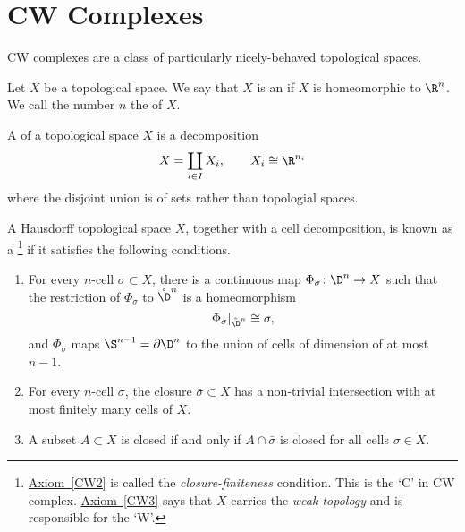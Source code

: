 \documentclass[main.tex]{subfiles}
\begin{document}
\section{CW Complexes}
\label{sec:cw_complexes}

CW complexes are a class of particularly nicely-behaved topological spaces.

\begin{definition}[cell]
  \label{def:cell}
  Let $X$ be a topological space. We say that $X$ is an  if $X$ is homeomorphic to $\R^{n}$. We call the number $n$ the  of $X$.
\end{definition}

\begin{definition}
  \label{def:cell_decomposition}
  A  of a topological space $X$ is a decomposition
  \begin{equation*}
    X = \coprod_{i \in I} X_{i},\qquad X_{i} \cong \R^{n_{i}}
  \end{equation*}
  where the disjoint union is of sets rather than topologial spaces.
\end{definition}

\begin{definition}[CW complex]
  \label{def:cw_complex}
  A Hausdorff topological space $X$, together with a cell decomposition, is known as a \footnote{\hyperref[CW2]{Axiom~\ref*{CW2}} is called the \emph{closure-finiteness} condition. This is the `C' in CW complex. \hyperref[CW3]{Axiom~\ref*{CW3}} says that $X$ carries the \emph{weak topology} and is responsible for the `W'.} if it satisfies the following conditions.
  \begin{enumerate}[label=(CW\arabic*), leftmargin=*]
    \item \label{CW1} For every $n$-cell $\sigma \subset X$, there is a continuous map $\Phi_{\sigma}\colon \D^{n} \to X$ such that the restriction of $\Phi_{\sigma}$ to $\mathring{\D}^{n}$ is a homeomorphism
      \begin{equation*}
        \left. \Phi_{\sigma} \right|_{\mathring{\D}^{n}} \cong \sigma,
      \end{equation*}
      and $\Phi_{\sigma}$ maps $\S^{n-1} = \partial \D^{n}$ to the union of cells of dimension of at most $n-1$.

    \item \label{CW2} For every $n$-cell $\sigma$, the closure $\bar{\sigma} \subset X$ has a non-trivial intersection with at most finitely many cells of $X$.

    \item \label{CW3} A subset $A \subset X$ is closed if and only if $A \cap \bar{\sigma}$ is closed for all cells $\sigma \in X$.
  \end{enumerate}
\end{definition}
\end{document}
